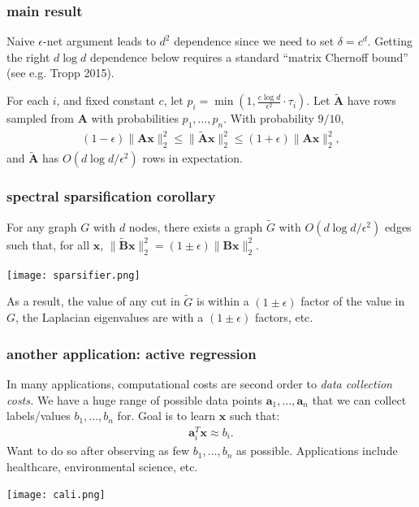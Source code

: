 \documentclass[compress]{beamer}
\newcommand{\bv}[1]{\mathbf{#1}}
\begin{document}
\begin{frame}[t]
	\frametitle{main result}
	Naive $\epsilon$-net argument leads to $d^2$ dependence since we need to set $\delta = c^d$. Getting the right $d\log d$ dependence below requires a standard ``matrix Chernoff bound'' (see e.g. Tropp 2015). 
	\begin{theorem}
		For each $i$, and fixed constant $c$, let $p_i = \min\left(1,\frac{c\log d}{\epsilon^2}\cdot \tau_i\right)$.
		Let ${\tilde{\bv{A}}}$ have rows sampled from $\bv{A}$ with probabilities $p_1, \ldots, p_n$. With probability $9/10$, 
		\begin{align*}
			(1-\epsilon)\|\bv{A}\bv{x}\|_2^2 \leq \|\tilde{\bv{A}} \bv{x}\|_2^2 \leq	(1+\epsilon)\|\bv{A}\bv{x}\|_2^2,
		\end{align*}
		and ${\tilde{\bv{A}}}$ has $O(d\log d/\epsilon^2)$ rows in expectation. 
	\end{theorem}
\end{frame}

\begin{frame}[t]
	\frametitle{spectral sparsification corollary}
	For any graph $G$ with $d$ nodes, there exists a graph $\tilde{G}$ with $O(d\log d/\epsilon^2)$ edges such that, for all $\bv{x}$, $\|\tilde{\bv{B}}\bv{x}\|_2^2 = (1\pm\epsilon)\|{\bv{B}}\bv{x}\|_2^2$. 
	\begin{center}
		\texttt{[image: sparsifier.png]}
	\end{center}
As a result, the value of any cut in $\tilde{G}$ is within a $(1\pm \epsilon)$ factor of the value in $G$, the Laplacian eigenvalues are with a $(1\pm \epsilon)$ factors, etc. 
\end{frame}

\begin{frame}[t]
	\frametitle{another application: active regression}	
	In many applications, computational costs are second order to \emph{data collection costs.} We have a huge range of possible data points $\bv{a}_1, \ldots, \bv{a}_n$ that we can collect labels/values $b_1,\ldots, b_n$ for. Goal is to learn $\bv{x}$ such that:
	\begin{align*}
		\bv{a}_i^T\bv{x} \approx b_i.
	\end{align*}
Want to do so after observing as few $b_1, \ldots, b_n$ as possible. 
Applications include healthcare, environmental science, etc. 
\begin{center}
	\vspace{-.5em}
	\texttt{[image: cali.png]}
\end{center}
\end{frame}	
\end{document}
